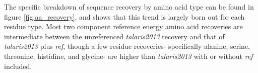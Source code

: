 The specific breakdown of sequence recovery by amino acid type can be found in figure \ref{fig:aa_recovery}, and shows that this trend is largely born out for each residue type.
Most two component reference energy amino acid recoveries are intermediate between the unreferenced \textit{talaris2013} recovery and that of \textit{talaris2013} plus \textit{ref}, though a few residue recoveries- specifically alanine, serine, threonine, histidine, and glycine- are higher than \textit{talaris2013} with or without \textit{ref} included.





